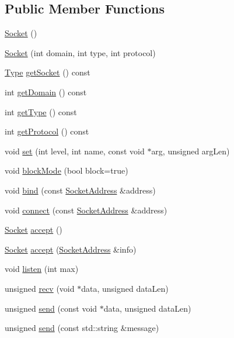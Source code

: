 \subsection*{Public Member Functions}
\begin{DoxyCompactItemize}
\item 
\hyperlink{a00062_a6fd698116ca5be14a389ffbb6afae878}{Socket} ()
\item 
\hyperlink{a00062_a311b1f77a2b477fb8fb8c8590a0c0733}{Socket} (int domain, int type, int protocol)
\item 
\hyperlink{a00062_aca677b9c8101e7ffd76ebe00ebd6416a}{Type} \hyperlink{a00062_adf2f60c82d1f8925b083c44e0c70f188}{get\-Socket} () const 
\item 
int \hyperlink{a00062_aa6411a204c36d0a9dbe4764d867c3dc1}{get\-Domain} () const 
\item 
int \hyperlink{a00062_a345d66a228604a2c5de1c30826948dd7}{get\-Type} () const 
\item 
int \hyperlink{a00062_ae27110221077f3f1340b5bd087a5d7ce}{get\-Protocol} () const 
\item 
void \hyperlink{a00062_a33e49c273fb178aa4192d32efcc4fffd}{set} (int level, int name, const void $\ast$arg, unsigned arg\-Len)
\item 
void \hyperlink{a00062_a0833134d276d7a11665845d009e9fbd4}{block\-Mode} (bool block=true)
\item 
void \hyperlink{a00062_a938b1f1f2596bf0948ecb576f05d1458}{bind} (const \hyperlink{a00063}{Socket\-Address} \&address)
\item 
void \hyperlink{a00062_a61132a96e6b938f77511d33ceffbdc88}{connect} (const \hyperlink{a00063}{Socket\-Address} \&address)
\item 
\hyperlink{a00062}{Socket} \hyperlink{a00062_a8304f9ebfd625a4a096c887703c16005}{accept} ()
\item 
\hyperlink{a00062}{Socket} \hyperlink{a00062_aedab276e469873d76d5d3321603c23a9}{accept} (\hyperlink{a00063}{Socket\-Address} \&info)
\item 
void \hyperlink{a00062_a7ca54e94356d26f241c81a8133e4031d}{listen} (int max)
\item 
unsigned \hyperlink{a00062_aff6cb056f1994b74a438a4077f7164bc}{recv} (void $\ast$data, unsigned data\-Len)
\item 
unsigned \hyperlink{a00062_a8a751c25daa8ec6d32c2f4a5bfc406d4}{send} (const void $\ast$data, unsigned data\-Len)
\item 
unsigned \hyperlink{a00062_a1ab4c4d619c36c6d58bbd3b6d7ee1e0e}{send} (const std\-::string \&message)

\end{DoxyCompactItemize}
